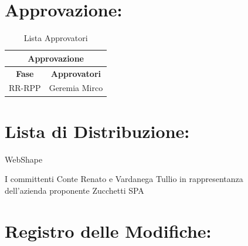 	
\section*{\LARGE Approvazione:}
\begin{table}[!h]
	\begin{center}
		\begin{tabular}
			{|c|c|}
			\hline
			\multicolumn{2}{|c|}{ \textbf{Approvazione} } \\
			\hline
			\textbf{Fase} & \textbf{Approvatori} \\
			\hline
			\multirow{1}{*}{RR-RPP} & Geremia Mirco\\
									
			\hline
		\end{tabular}
		\caption{Lista Approvatori} %
		\label{tabapprovazione}
	\end{center}
\end{table}

\textbf{}
\newpage
\section*{\LARGE Lista di Distribuzione:}

	\begin{elenconumerato}{\normindent}
		\item WebShape 
		\item I committenti Conte Renato e Vardanega Tullio in rappresentanza \\  dell'azienda proponente Zucchetti SPA
	\end{elenconumerato}





\section*{\Large Registro delle Modifiche:}


